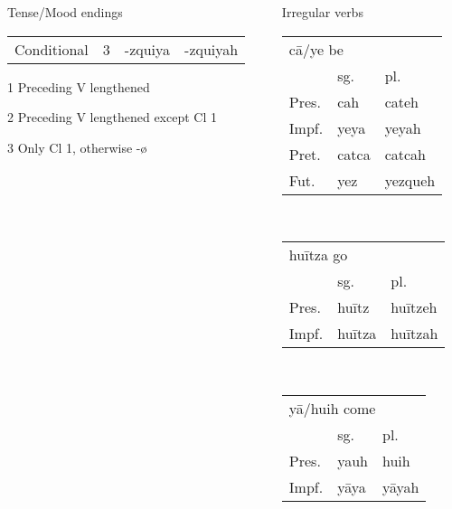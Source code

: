\documentclass[12pt]{beamer}
\newcommand{\nah}[1]{\textcolor{nahgrn}{#1}}
\newcommand{\trs}[1]{\textcolor{nahblu}{#1}}
\begin{document}
\begin{frame}
\begin{columns}[t]
\begin{column}{.18\linewidth}
\begin{block}{Tense/Mood endings}
\begin{threeparttable}
\begin{tabular}{llll}
            Conditional & 3 & \nah{-zquiya}      & \nah{-zquiyah}
          \end{tabular}
          \begin{tablenotes}
            \item[1] Preceding V lengthened
            \item[2] Preceding V lengthened except Cl 1
            \item[3] Only Cl 1, otherwise \nah{-ø}
          \end{tablenotes}
        \end{threeparttable}
      \end{block}
    \end{column}
    \begin{column}{.18\linewidth}
      \begin{block}{Irregular verbs}
        \begin{tabular}[t]{lll}
          \multicolumn{3}{l}{\nah{cā/ye} \trs{be}} \\
                & sg.         & pl.                \\
          Pres. & \nah{cah}   & \nah{cateh}        \\
          Impf. & \nah{yeya}  & \nah{yeyah}        \\
          Pret. & \nah{catca} & \nah{catcah}       \\
          Fut.  & \nah{yez}   & \nah{yezqueh}      \\
        \end{tabular}%
        \\[1ex]
        \begin{tabular}[t]{lll}
          \multicolumn{3}{l}{\nah{huītza} \trs{go}} \\
                & sg.          & pl.                \\
          Pres. & \nah{huītz}  & \nah{huītzeh}      \\
          Impf. & \nah{huītza} & \nah{huītzah}      \\
        \end{tabular}%
        \\[1ex]
        \begin{tabular}[t]{lll}
          \multicolumn{3}{l}{\nah{yā/huih} \trs{come}} \\
                & sg.        & pl.                     \\
          Pres. & \nah{yauh} & \nah{huih}              \\
          Impf. & \nah{yāya} & \nah{yāyah}             \\

\end{tabular}
\end{block}
\end{column}
\end{columns}
\end{frame}
\end{document}
